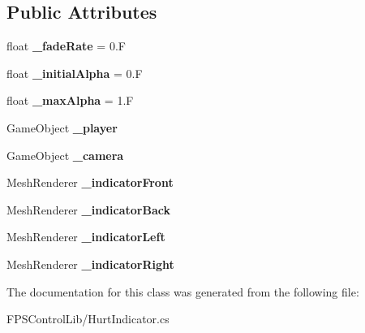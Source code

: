 \subsection*{Public Attributes}
\begin{DoxyCompactItemize}
\item 
\hypertarget{class_f_p_s_control_1_1_hurt_indicator_abb30697008903b7caf75bfde52fdf44d}{float {\bfseries \-\_\-fade\-Rate} = 0.\-F}\label{class_f_p_s_control_1_1_hurt_indicator_abb30697008903b7caf75bfde52fdf44d}

\item 
\hypertarget{class_f_p_s_control_1_1_hurt_indicator_a7d6ebac1c07487754f37f88f4f831ba7}{float {\bfseries \-\_\-initial\-Alpha} = 0.\-F}\label{class_f_p_s_control_1_1_hurt_indicator_a7d6ebac1c07487754f37f88f4f831ba7}

\item 
\hypertarget{class_f_p_s_control_1_1_hurt_indicator_a2eed707889ffb3adb381c4ebc93cd6b3}{float {\bfseries \-\_\-max\-Alpha} = 1.\-F}\label{class_f_p_s_control_1_1_hurt_indicator_a2eed707889ffb3adb381c4ebc93cd6b3}

\item 
\hypertarget{class_f_p_s_control_1_1_hurt_indicator_a68c6969bd58af7c53f478a8cb49a4444}{Game\-Object {\bfseries \-\_\-player}}\label{class_f_p_s_control_1_1_hurt_indicator_a68c6969bd58af7c53f478a8cb49a4444}

\item 
\hypertarget{class_f_p_s_control_1_1_hurt_indicator_a8c5e9728eaa375f77f6badecdaaff644}{Game\-Object {\bfseries \-\_\-camera}}\label{class_f_p_s_control_1_1_hurt_indicator_a8c5e9728eaa375f77f6badecdaaff644}

\item 
\hypertarget{class_f_p_s_control_1_1_hurt_indicator_a843db9e7e1514b89094235a133d17f05}{Mesh\-Renderer {\bfseries \-\_\-indicator\-Front}}\label{class_f_p_s_control_1_1_hurt_indicator_a843db9e7e1514b89094235a133d17f05}

\item 
\hypertarget{class_f_p_s_control_1_1_hurt_indicator_af54209ae1746010f45f3736886a76e57}{Mesh\-Renderer {\bfseries \-\_\-indicator\-Back}}\label{class_f_p_s_control_1_1_hurt_indicator_af54209ae1746010f45f3736886a76e57}

\item 
\hypertarget{class_f_p_s_control_1_1_hurt_indicator_ac26dce6cf079940b9fc4a1a32d4cb5f8}{Mesh\-Renderer {\bfseries \-\_\-indicator\-Left}}\label{class_f_p_s_control_1_1_hurt_indicator_ac26dce6cf079940b9fc4a1a32d4cb5f8}

\item 
\hypertarget{class_f_p_s_control_1_1_hurt_indicator_a326e1937d6ed312438a4606356973ba4}{Mesh\-Renderer {\bfseries \-\_\-indicator\-Right}}\label{class_f_p_s_control_1_1_hurt_indicator_a326e1937d6ed312438a4606356973ba4}

\end{DoxyCompactItemize}


The documentation for this class was generated from the following file\-:\begin{DoxyCompactItemize}
\item 
F\-P\-S\-Control\-Lib/Hurt\-Indicator.\-cs\end{DoxyCompactItemize}
